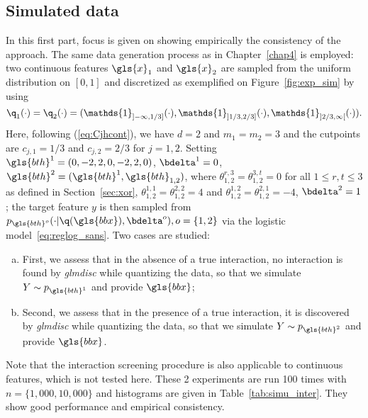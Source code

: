 \subsection{Simulated data}

In this first part, focus is given on showing empirically the consistency of the approach. The same data generation process as in Chapter~\ref{chap4} is employed: two continuous features $\gls{x}_1$ and $\gls{x}_2$ are sampled from the uniform distribution on $[0,1]$ and discretized as exemplified on Figure~\ref{fig:exp_sim} by using
\[\q_1(\cdot)=\q_2(\cdot) = (\mathds{1}_{]-\infty,1/3]}(\cdot),\mathds{1}_{]1/3,2/3]}(\cdot),\mathds{1}_{]2/3,\infty[}(\cdot)).\]
Here, following (\ref{eq:Cjhcont}), we have $d=2$ and $m_1=m_2=3$ and the cutpoints are $c_{j,1}=1/3$ and $c_{j,2}=2/3$ for $j=1,2$. Setting $\gls{bth}^{1}=(0,-2,2,0,-2,2,0)$, $\bdelta^{1} = 0$, $\gls{bth}^{2} = (\gls{bth}^{1},\gls{bth}_{1,2})$, where $\theta_{1,2}^{r,3} = \theta_{1,2}^{3,t} = 0$ for all $1 \leq r,t \leq 3$ as defined in Section~\ref{sec:xor}, $\theta_{1,2}^{1,1} = \theta_{1,2}^{2,2} = 4$ and $\theta_{1,2}^{1,2} = \theta_{1,2}^{2,1} = -4$, $\bdelta^{2} = 1$; the target feature $y$ is then sampled from $p_{\gls{bth}^{o}}(\cdot | \q(\gls{bbx}), \bdelta^{o}), o = \{1,2\}$ via the logistic model~\eqref{eq:reglog_sans}. Two cases are studied:
\begin{enumerate}[(a)]
    \item First, we assess that in the absence of a true interaction, no interaction is found by \textit{glmdisc} while quantizing the data, so that we simulate $Y \sim p_{\gls{bth}^{1}}$ and provide $\gls{bbx}$;
    \item Second, we assess that in the presence of a true interaction, it is discovered by \textit{glmdisc} while quantizing the data, so that we simulate $Y \sim p_{\gls{bth}^{2}}$ and provide $\gls{bbx}$.
\end{enumerate}
Note that the interaction screening procedure is also applicable to continuous features, which is not tested here. These 2 experiments are run 100 times with $n = \{1{,}000,10{,}000\}$ and histograms are given in Table~\ref{tab:simu_inter}. They show good performance and empirical consistency.

